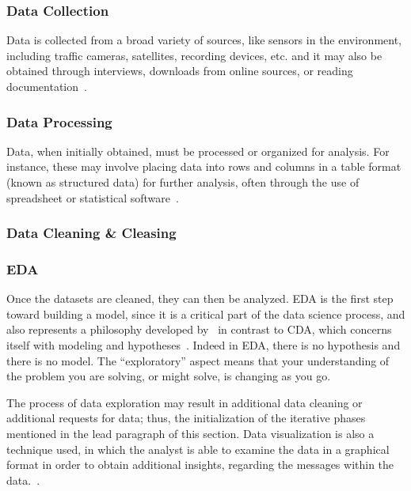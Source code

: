 
\subsubsection{Data Collection}
Data is collected from a broad variety of sources, like sensors in the environment, including traffic cameras, satellites, recording devices, etc. and 
it may also be obtained through interviews, downloads from online sources, or reading documentation~\cite{Book:doing_data_science}.

\subsubsection{Data Processing}
Data, when initially obtained, must be processed or organized for analysis.
For instance, these may involve placing data into rows and columns in a table format (known as structured data) for further analysis, often through the use of spreadsheet or statistical software~\cite{Book:doing_data_science}.

\subsubsection{Data Cleaning \& Cleasing}

\subsubsection{\acl{EDA}}
Once the datasets are cleaned, they can then be analyzed.
\ac{EDA} is the first step toward building a model, since it is a critical part of the data science process, and also represents a philosophy developed by~\citeauthor{Article:future_of_data_tukey} 
in contrast to \ac{CDA}, which concerns itself with modeling and hypotheses~\cite{Article:future_of_data_tukey}. 
Indeed in \ac{EDA}, there is no hypothesis and there is no model. The ``exploratory'' aspect means that your understanding of the problem you are solving, or might solve, is changing as you go.

The process of data exploration may result in additional data cleaning or additional requests for data; thus, the initialization of the iterative phases mentioned in the lead paragraph of this section.
Data visualization is also a technique used, in which the analyst is able to examine the data in a graphical format in order to obtain additional insights, regarding the messages within the data.~\cite{Book:doing_data_science}.

